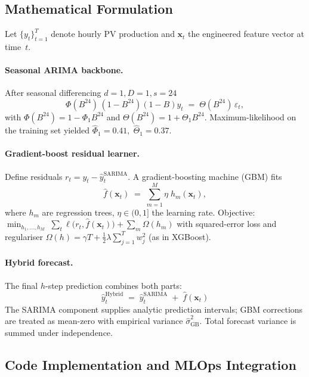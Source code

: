 \subsection{Mathematical Formulation}
\label{ssec:fcast-math}

Let \(\{y_t\}_{t=1}^T\) denote hourly PV production and \(\mathbf{x}_t\) the engineered feature vector at time~\(t\).

\paragraph{Seasonal ARIMA backbone.}
After seasonal differencing \(d=1, D=1, s=24\)
\[
  \Phi(B^{24})\,(1-B^{24}) (1-B) y_t
  \;=\;
  \Theta(B^{24})\,\varepsilon_t,
\]
with \(\Phi(B^{24}) = 1 - \Phi_1 B^{24}\) and \(\Theta(B^{24}) = 1 + \Theta_1 B^{24}\).  
Maximum-likelihood on the training set yielded
\(\widehat\Phi_1 = 0.41,\; \widehat\Theta_1 = 0.37\).

\paragraph{Gradient-boost residual learner.}
Define residuals
\(
  r_t = y_t - \hat{y}^{\text{SARIMA}}_t.
\)
A gradient-boosting machine (GBM) fits
\[
  \hat f(\mathbf{x}_t)
  \;=\;
  \sum_{m=1}^M \eta\; h_m(\mathbf{x}_t),
\]
where \(h_m\) are regression trees, \(\eta\in(0,1]\) the learning rate.  
Objective:
\(
  \min_{h_1,\dots,h_M}\;
  \sum_{t} \ell\!\bigl(r_t, \hat f(\mathbf{x}_t)\bigr)
  + \sum_{m} \Omega(h_m)
\)
with squared-error loss and regulariser
\(
  \Omega(h)=\gamma T + \tfrac{1}{2}\lambda\!\!\sum_{j=1}^T w_j^2
\)
(as in XGBoost).

\paragraph{Hybrid forecast.}  The final \(h\)-step prediction combines both parts:
\[
  \boxed{\;
    \hat y_t^{\text{Hybrid}}
    \;=\;
    \hat y_t^{\text{SARIMA}}
    \;+\;
    \hat f(\mathbf{x}_t)
  \;}
\]
The SARIMA component supplies analytic prediction intervals; GBM corrections are treated as mean-zero with empirical variance \(\widehat{\sigma}_{\text{GB}}^2\).  
Total forecast variance is summed under independence.

\subsection{Code Implementation and MLOps Integration}
\label{ssec:fcast-code}


